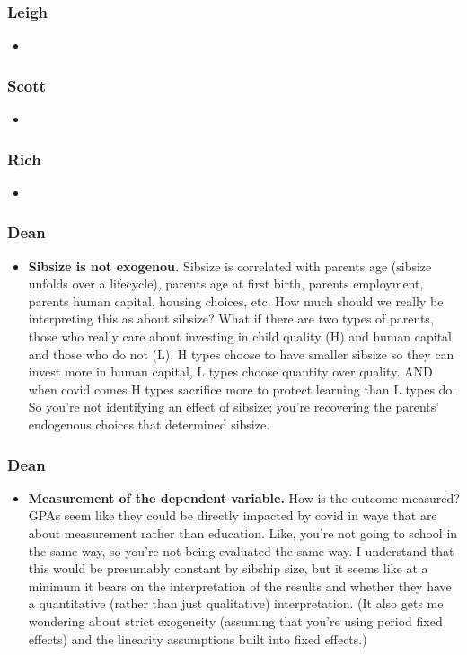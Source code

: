 \documentclass{beamer}
\begin{document}
\begin{frame}
        \label{frame:Leigh}
    \frametitle{Leigh}
    \begin{itemize}
        \item 
    \end{itemize}
\end{frame}

\begin{frame}
        \label{frame:Scott}
    \frametitle{Scott}
    \begin{itemize}
        \item 
    \end{itemize}
\end{frame}

\begin{frame}
        \label{frame:Rich}
    \frametitle{Rich}
    \begin{itemize}
        \item 
    \end{itemize}
\end{frame}


\begin{frame}
        \label{frame:dean}
    \frametitle{Dean}
    \begin{itemize}
        \item \textbf{Sibsize is not exogenou.}  Sibsize is correlated with parents age (sibsize unfolds over a lifecycle), parents age at first birth, parents employment, parents human capital, housing choices, etc. How much should we really be interpreting this as about sibsize? What if there are two types of parents, those who really care about investing in child quality (H) and human capital and those who do not (L). H types choose to have smaller sibsize so they can invest more in human capital, L types choose quantity over quality. AND when covid comes H types sacrifice more to protect learning than L types do. So you’re not identifying an effect of sibsize; you’re recovering the parents’ endogenous choices that determined sibsize.
    \end{itemize}
\end{frame}

\begin{frame}
        \label{frame:dean2}
    \frametitle{Dean}
    \begin{itemize}
        \item \textbf{Measurement of the dependent variable.}   How is the outcome measured? GPAs seem like they could be directly impacted by covid in ways that are about measurement rather than education. Like, you’re not going to school in the same way, so you’re not being evaluated the same way. I understand that this would be presumably constant by sibship size, but it seems like at a minimum it bears on the interpretation of the results and whether they have a quantitative (rather than just qualitative) interpretation. (It also gets me wondering about strict exogeneity (assuming that you’re using period fixed effects) and the linearity assumptions built into fixed effects.)
    \end{itemize}
\end{frame}
\end{document}
